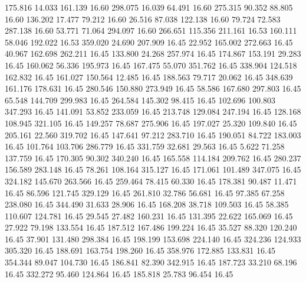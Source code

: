  175.816   14.033  161.139        16.60
 298.075   16.039   64.491        16.60
 275.315   90.352   88.805        16.60
 136.202   17.477   79.212        16.60
  26.516   87.038  122.138        16.60
  79.724   72.583  287.138        16.60
  53.771   71.064  294.097        16.60
 266.651  115.356  211.161        16.53
 160.111   58.046  192.022        16.53
 359.020   24.690  207.909        16.45
  22.952  165.002  272.663        16.45
  40.967  162.698  262.211        16.45
 133.800   24.268  257.974        16.45
 174.867  153.191   29.283        16.45
 160.062   56.336  195.973        16.45
 167.475   55.070  351.762        16.45
 338.904  124.518  162.832        16.45
 161.027  150.564   12.485        16.45
 188.563   79.717   20.062        16.45
 348.639  161.176  178.631        16.45
 280.546  150.880  273.949        16.45
  58.586  167.680  297.803        16.45
  65.548  144.709  299.983        16.45
 264.584  145.302   98.415        16.45
 102.696  100.803  347.293        16.45
 141.091   53.852  233.059        16.45
 213.748  129.084  247.194        16.45
 128.168  108.945  321.105        16.45
 149.257   78.687  275.906        16.45
 197.027   25.320  109.840        16.45
 205.161   22.560  319.702        16.45
 147.641   97.212  283.710        16.45
 190.051   84.722  183.003        16.45
 101.764  103.706  286.779        16.45
 331.759   32.681   29.563        16.45
   5.622   71.258  137.759        16.45
 170.305   90.302  340.240        16.45
 165.558  114.184  209.762        16.45
 280.237  156.589  283.148        16.45
  78.261  108.164  315.127        16.45
 171.061  101.489  347.075        16.45
 324.182  145.670  263.566        16.45
 259.464   78.415   60.330        16.45
 178.381   90.487   11.471        16.45
  86.596  121.745  329.129        16.45
 261.810   32.786   56.681        16.45
  97.385   67.258  238.080        16.45
 344.490   31.633   28.906        16.45
 168.208   38.718  109.503        16.45
  58.385  110.607  124.781        16.45
  29.545   27.482  160.231        16.45
 131.395   22.622  165.069        16.45
  27.922   79.198  133.554        16.45
 187.512  167.486  199.224        16.45
  35.527   88.320  120.240        16.45
  37.901  131.480  298.384        16.45
 198.199  153.698  224.140        16.45
 324.236  124.933  305.320        16.45
 188.691  163.754  198.260        16.45
 358.976  172.885  133.831        16.45
 354.344   89.047  104.730        16.45
 186.841   82.390  342.915        16.45
 187.723   33.210   68.196        16.45
 332.272   95.460  124.864        16.45
 185.818   25.783   96.454        16.45
